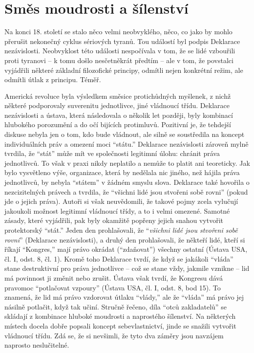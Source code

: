 \documentclass{book}
\begin{document}
\section{Směs moudrosti a šílenství}

Na konci 18. století se stalo něco velmi neobvyklého, něco, co jako by mohlo přerušit nekonečný cyklus sériových tyranů. Tou událostí byl podpis Deklarace nezávislosti. Neobvyklost této události nespočívala v tom, že se lidé vzbouřili proti tyranovi -- k tomu došlo nesčetněkrát předtím -- ale v tom, že povstalci vyjádřili některé základní filozofické principy, odmítli nejen konkrétní režim, ale odmítli útlak z principu. Téměř.

Americká revoluce byla výsledkem směsice protichůdných myšlenek, z nichž některé podporovaly suverenitu jednotlivce, jiné vládnoucí třídu. Deklarace nezávislosti a ústava, která následovala o několik let později, byly kombinací hlubokého porozumění a do očí bijících protimluvů. Pozitivní je, že tehdejší diskuse nebyla jen o tom, kdo bude vládnout, ale silně se soustředila na koncept individuálních práv a omezení moci \enquote{státu.} Deklarace nezávislosti zároveň mylně tvrdila, že \enquote{stát} může mít ve společnosti legitimní úlohu: chránit práva jednotlivců. To však v praxi nikdy neplatilo a nemůže to platit ani teoreticky. Jak bylo vysvětleno výše, organizace, která by nedělala nic jiného, než hájila práva jednotlivců, by nebyla \enquote{státem} v žádném smyslu slova. Deklarace také hovořila o nezcizitelných právech a tvrdila, že \enquote{všichni lidé jsou stvořeni sobě rovni} (pokud jde o jejich práva). Autoři si však neuvědomili, že takové pojmy zcela vylučují jakoukoli možnost legitimní vládnoucí třídy, a to i velmi omezené. Samotné zásady, které vyjádřili, pak byly okamžitě popřeny jejich snahou vytvořit protektorský \enquote{stát.} Jeden den prohlašovali, že \enquote{\emph{všichni lidé jsou stvořeni sobě rovni}} (Deklarace nezávislosti), a druhý den prohlašovali, že někteří lidé, kteří si říkají \enquote{Kongres,} mají právo okrádat (\enquote{zdaňovat}) všechny ostatní (Ústava USA, čl. I, odst. 8, čl. 1). Kromě toho Deklarace tvrdí, že když se jakákoli \enquote{vláda} stane destruktivní pro práva jednotlivce -- což se stane vždy, jakmile vznikne -- lid má povinnost ji změnit nebo zrušit. Ústava však tvrdí, že Kongresu dává pravomoc \enquote{potlačovat vzpoury} (Ústava USA, čl. I, odst. 8, bod 15). To znamená, že lid má právo vzdorovat útlaku \enquote{vlády,} ale že \enquote{vláda} má právo jej násilně potlačit, když tak učiní. Stručně řečeno, díla \enquote{otců zakladatelů} se skládají z kombinace hluboké moudrosti a naprostého šílenství. Na některých místech docela dobře popsali koncept sebevlastnictví, jinde se snažili vytvořit vládnoucí třídu. Zdá se, že si nevšimli, že tyto dva záměry jsou navzájem naprosto neslučitelné.
\end{document}
